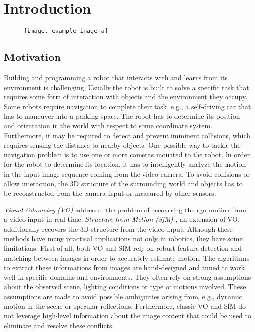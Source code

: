 \chapter{Introduction}
	
	
	
	
	\begin{figure}
		\centering
		\texttt{[image: example-image-a]}
		\caption{\label{fig:sfm-example}}
	\end{figure}
		
	\section{Motivation}
		
		Building and programming a robot that interacts with and learns from its environment is challenging.
		Usually the robot is built to solve a specific task that requires some form of interaction with objects and the environment they occupy.
		Some robots require navigation to complete their task, e.g., a self-driving car that has to maneuver into a parking space.
		The robot has to determine its position and orientation in the world with respect to some coordinate system.
		Furthermore, it may be required to detect and prevent imminent collisions, which requires sensing the distance to nearby objects.
		One possible way to tackle the navigation problem is to use one or more cameras mounted to the robot.
		In order for the robot to determine its location, it has to intelligently analyze the motion in the input image sequence coming from the video camera.
		To avoid collisions or allow interaction, the 3D structure of the surrounding world and objects has to be reconstructed from the camera input or measured by other sensors.
		
		\emph{Visual Odometry (VO)}  addresses the problem of recovering the ego-motion from a video input in real-time. 
		\emph{Structure from Motion (SfM)} , an extension of VO, additionally recovers the 3D structure from the video input.
		Although these methods have many practical applications not only in robotics, they have some limitations.
		First of all, both VO and SfM rely on robust feature detection and matching between images in order to accurately estimate motion.
		The algorithms to extract these informations from images are hand-designed and tuned to work well in specific domains and environments.
		They often rely on strong assumptions about the observed scene, lighting conditions or type of motions involved.
		These assumptions are made to avoid possible ambiguities arising from, e.g., dynamic motion in the scene or specular reflections.
		Furthermore, classic VO and SfM do not leverage high-level information about the image content that could be used to eliminate and resolve these conflicts.
		
